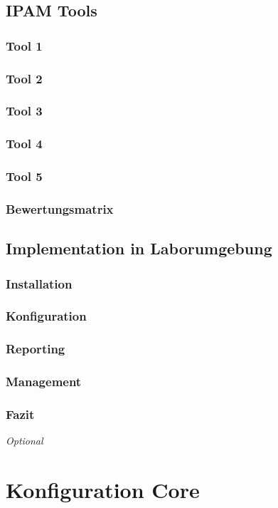 \documentclass[11pt,a4paper,parskip=half]{scrartcl}
\begin{document}
\subsection{IPAM Tools}
\subsubsection{Tool 1}
\subsubsection{Tool 2}
\subsubsection{Tool 3}
\subsubsection{Tool 4}
\subsubsection{Tool 5}
\subsubsection{Bewertungsmatrix}
\subsection{Implementation in Laborumgebung}
\subsubsection{Installation}
\subsubsection{Konfiguration}
\subsubsection{Reporting}
\subsubsection{Management}
\subsubsection{Fazit}
\textit{Optional}

\newpage
\appendix
{}
{}
\section{Konfiguration Core}

\newpage
\end{document}
